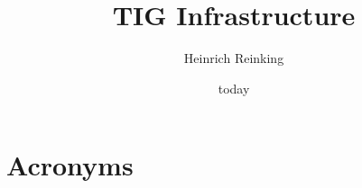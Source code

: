 \documentclass[PMO,authoryear,toc]{lsstdoc}
\title{TIG Infrastructure}
\author{%
Heinrich Reinking
}
\date{today}
\begin{document}
\maketitle


\appendix
\renewcommand{\refname}{} %


\section{Acronyms} \label{sec:acronyms}

\end{document}
